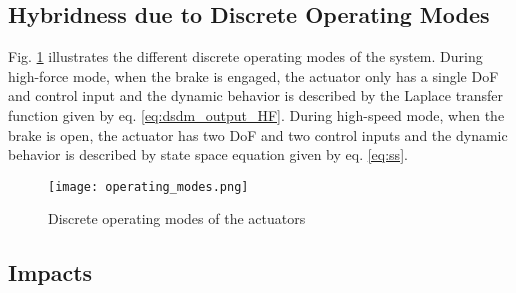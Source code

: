 \subsection{Hybridness due to Discrete Operating Modes}

Fig. \ref{fig:operatingmodes} illustrates the different discrete operating modes of the system. During high-force mode, when the brake is engaged, the actuator only has a single DoF and control input and the dynamic behavior is described by the Laplace transfer function given by eq. \eqref{eq:dsdm_output_HF}. During high-speed mode, when the brake is open, the actuator has two DoF and two control inputs and the dynamic behavior is described by state space equation given by eq. \eqref{eq:ss}.

\begin{figure}[H]
	\centering
		\texttt{[image: operating\_modes.png]}
	\caption{Discrete operating modes of the actuators}
	\label{fig:operatingmodes}
\end{figure}


\subsection{Impacts}
\label{sec:model_impact}

